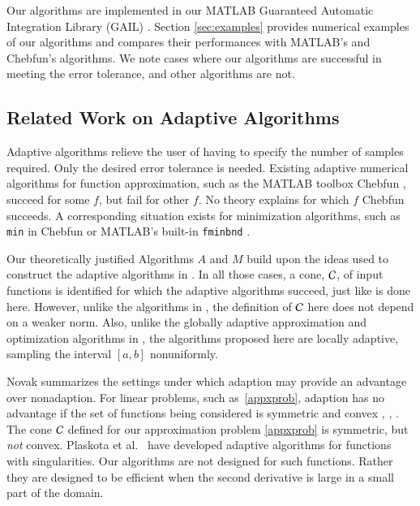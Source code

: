 \documentclass[review]{elsarticle}
\theoremstyle{definition}
\begin{document}
Our algorithms are implemented in our MATLAB Guaranteed Automatic
Integration Library (GAIL) \cite{ChoEtal15a}. Section \ref{sec:examples}
provides numerical examples of our algorithms and compares their
performances with MATLAB's and Chebfun's algorithms. We note cases where our
algorithms are successful in meeting the error tolerance, and other
algorithms are not.

\subsection{Related Work on Adaptive Algorithms}

Adaptive algorithms relieve the user of having to specify the number of samples
required. Only the desired error tolerance is needed. Existing adaptive
numerical algorithms for function approximation, such as the MATLAB toolbox
Chebfun \citep{TrefEtal16a}, succeed for some $f$, but fail for other $f$. No
theory explains for which $f$ Chebfun succeeds. A corresponding situation exists
for minimization algorithms, such as \texttt{min} in Chebfun or MATLAB's
built-in \texttt{fminbnd} \citep{MAT9.1}.

Our theoretically justified Algorithms $A$ and $M$ build upon the ideas used to
construct the adaptive algorithms in \cite{HicEtal14b, Din15a, HicEtal14a,
HicJim16a, Jia16a, JimHic16a,Ton14a}. In all those cases, a
cone, $\mathcal{C}$, of input functions is identified for which the adaptive algorithms
succeed, just like is done here. However, unlike the algorithms in \cite{HicEtal14b, Din15a,
HicEtal14a,Ton14a}, the definition of $\mathcal{C}$ here does not
depend on a weaker norm. Also, unlike
the globally adaptive approximation and optimization algorithms in
\cite{HicEtal14b,Ton14a}, the algorithms proposed here are locally adaptive,
sampling the interval $[a, b]$ nonuniformly.

Novak \cite{Nov96a} summarizes the settings under which adaption may provide an
advantage over nonadaption. For linear problems, such as~\eqref{appxprob},
adaption has no advantage if the set of functions being considered is symmetric
and convex \cite[Theorem 1]{Nov96a}, \cite[Chapter 4, Theorem
5.2.1]{TraWasWoz88}, \cite{Woz88a}.
The cone $\mathcal{C}$ defined for our approximation problem
\eqref{appxprob} is symmetric, but \emph{not} convex. Plaskota et al.~\cite{PlaEtal08a}
have developed adaptive algorithms for functions with singularities. Our
algorithms are not designed for such functions. Rather they are
designed to be efficient when the second derivative is large in a small part of
the domain.
\end{document}
